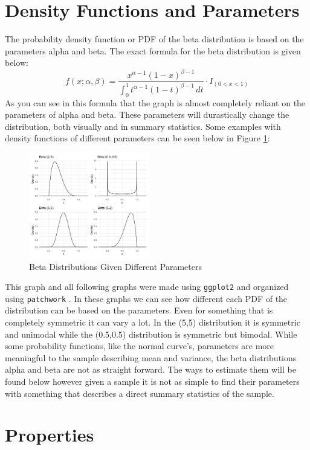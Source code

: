 \documentclass{article}\usepackage[]{graphicx}\usepackage[]{xcolor}
\begin{document}
\begin{multicols}{2}
\section{Density Functions and Parameters}
The probability density function or PDF of the beta distribution is based on the parameters alpha and beta. The exact formula for the beta distribution is given below:
\[
f(x; \alpha, \beta) = \frac{x^{\alpha-1}(1-x)^{\beta-1}}{\int_0^1 t^{\alpha-1}(1-t)^{\beta-1} \, dt} \cdot I_{(0 < x < 1)}
\]
As you can see in this formula that the graph is almost completely reliant on the parameters of alpha and beta. These parameters will durastically change the distribution, both visually and in summary statistics. Some examples with density functions of different parameters can be seen below in Figure \ref{Figure 1}:
\raggedcolumns\begin{figure}[H]
\centering
\includegraphics[width=0.47\textwidth]{BDistributions.png}  %
\caption{Beta Distributions Given Different Parameters}
\label{Figure 1}
\end{figure}
This graph and all following graphs were made using \texttt{ggplot2} and organized using \texttt{patchwork} \citep{ggplot} \citep{patchwork}. In these graphs we can see how different each PDF of the distribution can be based on the parameters. Even for something that is completely symmetric it can vary a lot. In the (5,5) distribution it is symmetric and unimodal while the (0.5,0.5) distribution is symmetric but bimodal.
While some probability functions, like the normal curve's, parameters are more meaningful to the sample describing mean and variance, the beta distributions alpha and beta are not as straight forward. The ways to estimate them will be found below however given a sample it is not as simple to find their parameters with something that describes a direct summary statistics of the sample. 

\section{Properties}


\end{multicols}
\end{document}
